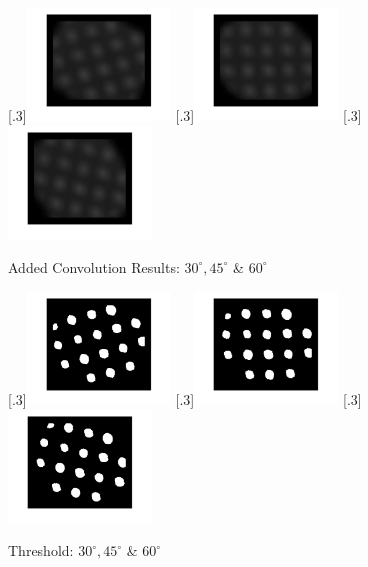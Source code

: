 \documentclass[a4paper]{article}
\begin{document}
	\begin{figure}[H]
		\centering
		[.3\linewidth]{\includegraphics[height=3cm]{Results/Q3/a/qaAddedConv30.jpg}}%
		[.3\linewidth]{\includegraphics[height=3cm]{Results/Q3/a/qaAddedConv45.jpg}}%
		[.3\linewidth]{\includegraphics[height=3cm]{Results/Q3/a/qaAddedConv60.jpg}}%
		\caption{Added Convolution Results: $30^\circ, 45^\circ$ \& $60^\circ$}
		\label{fig:}
	\end{figure}
	\begin{figure}[H]
		\centering
		[.3\linewidth]{\includegraphics[height=3cm]{Results/Q3/a/qaThresh30.jpg}}%
		[.3\linewidth]{\includegraphics[height=3cm]{Results/Q3/a/qaThresh45.jpg}}%
		[.3\linewidth]{\includegraphics[height=3cm]{Results/Q3/a/qaThresh60.jpg}}%
		\caption{Threshold: $30^\circ, 45^\circ$ \& $60^\circ$}
		\label{fig:}
	\end{figure}
\end{document}
